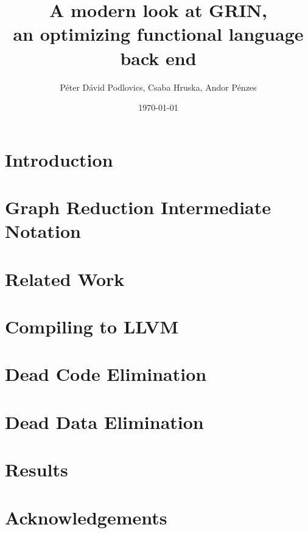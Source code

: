 \documentclass[10pt,a4paper,oneside]{article}
\title{\vspace{-2cm}A modern look at GRIN,\\ an optimizing functional language back end}
\date{\today}
\author{Péter Dávid Podlovics, Csaba Hruska, Andor Pénzes}
\begin{document}
	
	\maketitle
	
	
	\section{Introduction} \label{sec-intro}
	
	
	\section{Graph Reduction Intermediate Notation}
	
	
	\section{Related Work}
	
	
	\section{Compiling to LLVM}
	
	
	\section{Dead Code Elimination}
	
	
	\section{Dead Data Elimination}
	
	
	\section{Results}
	
	
	
	
	\section*{Acknowledgements}
	
	
	

	
\end{document}
